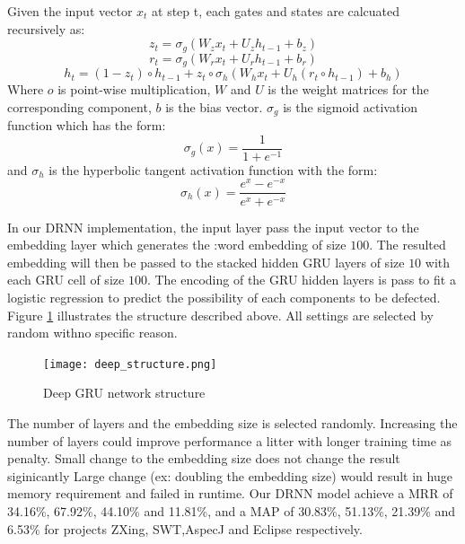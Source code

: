 Given the input vector $x_t$ at step t, each gates and states are calcuated recursively as:
\begin{equation}
	z_t = \sigma_g(W_zx_t+U_{z}h_{t-1}+b_z)
\end{equation}	
\begin{equation}
	r_t =  \sigma_g(W_rx_t+U_{r}h_{t-1}+b_r)
\end{equation}	
\begin{equation}
	h_t=(1-z_t) \circ h_{t-1} + z_t \circ \sigma_h(W_hx_t+U_{h}(r_t \circ h_{t-1})+b_h)
\end{equation}
Where $o$ is point-wise multiplication, $W$ and $U$ is the weight matrices for the corresponding component, $b$ is the bias vector.
$\sigma_g$ is the sigmoid activation function which has the form:
\begin{equation}
	\sigma_g(x) = \frac{1}{1+e^{-1}}
\end{equation}
and $\sigma_h$ is the hyperbolic tangent activation function with the form:
\begin{equation}
\sigma_h(x)=\frac{e^x - e^{-x}}{e^x + e^{-x}}	
\end{equation}

In our DRNN implementation, the input layer pass the input vector to the embedding layer which generates the :word embedding of size $100$.
The resulted embedding will then be passed to the stacked hidden GRU layers of size $10$ with each GRU cell of size $100$.
The encoding of the GRU hidden layers is pass to fit a logistic regression to predict the possibility of each components to be defected.
Figure \ref{dnn} illustrates the structure described above. All settings are selected by random withno specific reason.

\begin{figure}
	\texttt{[image: deep\_structure.png]}
	\caption{Deep GRU network structure}
	\label{dnn}
\end{figure}

The number of layers and the embedding size is selected randomly. 
Increasing the number of layers could improve performance a litter with longer training time as penalty.
Small change to the embedding size does not change the result siginicantly
Large change (ex: doubling the embedding size) would result in huge memory requirement and failed in runtime.
Our DRNN model achieve a MRR of 34.16\%, 67.92\%, 44.10\% and 11.81\%, and a MAP of 30.83\%, 51.13\%, 21.39\% and 6.53\%  for projects ZXing, SWT,AspecJ and Eclipse respectively. 

